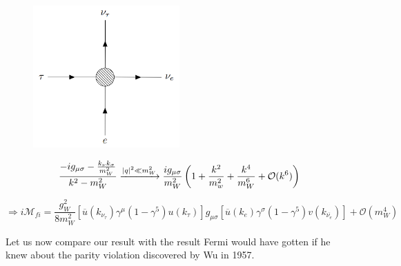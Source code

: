 \documentclass[../Bachelorarbeit.tex]{subfiles}
\begin{document}
\begin{figure}[h]
    \centering
    \includegraphics[width=0.5\textwidth]{images/propagator_collaps.PNG}
\end{figure}
\begin{equation}
    \frac{-ig_{\mu\sigma}-\frac{k_{\nu}k_{\sigma}}{m_{W}^{2}}}{k^{2}-m_{W}^{2}} \xrightarrow{\abs{q}^{2} \ll m_{W}^{2}} \frac{ig_{\mu\sigma}}{m_{W}^{2}} \left( 1 + \frac{k^{2}}{m_{w}^{2}}+\frac{k^{4}}{m_{W}^{6}}+\mathcal{O}(k^6) \right)
    \label{eq:Fermi_propergator}
\end{equation}

\begin{equation}
    \Rightarrow i\mathcal{M}_{fi}=\frac{g_{W}^{2}}{8 m_{W}^{2}} \left[ \overline{u}(k_{\nu_{\tau}})\gamma^{\mu}(1-\gamma^{5})u(k_{\tau}) \right] g_{\mu\sigma} \left[ \overline{u}(k_{e})\gamma^{\sigma}(1-\gamma^{5})v(k_{\overline{\nu_{e}}}) \right] + \mathcal{O}(m_{W}^{4})
    \label{eq:Fermi_colapse}
\end{equation}

Let us now compare our result with the result Fermi would have gotten if he knew about the parity violation discovered by Wu in 1957.
\end{document}
